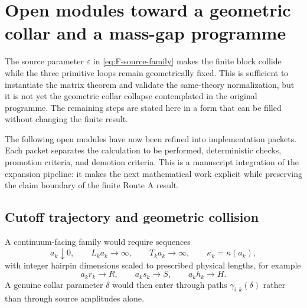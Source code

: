 \documentclass[11pt]{article}
\newcommand{\eps}{\varepsilon}
\begin{document}
\section{Open modules toward a geometric collar and a mass-gap programme}
\label{sec:open-modules}

The source parameter $\eps$ in \eqref{eq:F-source-family} makes the finite block collide while the three primitive loops remain geometrically fixed.  This is sufficient to instantiate the matrix theorem and validate the same-theory normalization, but it is not yet the geometric collar collapse contemplated in the original programme.  The remaining steps are stated here in a form that can be filled without changing the finite result.

The following open modules have now been refined into implementation packets.  Each packet separates the calculation to be performed, deterministic checks, promotion criteria, and demotion criteria.  This is a manuscript integration of the expansion pipeline: it makes the next mathematical work explicit while preserving the claim boundary of the finite Route A result.

\subsection{Cutoff trajectory and geometric collision}

A continuum-facing family would require sequences
\begin{equation}
  a_k\downarrow0,
  \qquad
  L_ka_k\longrightarrow\infty,
  \qquad
  T_ka_k\longrightarrow\infty,
  \qquad
  \kappa_k=\kappa(a_k),
  \label{eq:cutoff-trajectory}
\end{equation}
with integer hairpin dimensions scaled to prescribed physical lengths, for example
\begin{equation}
  a_kr_k\to R,
  \qquad
  a_ks_k\to S,
  \qquad
  a_kh_k\to H.
  \label{eq:physical-loop-scaling}
\end{equation}
A genuine collar parameter $\delta$ would then enter through paths $\gamma_{i,k}(\delta)$ rather than through source amplitudes alone.
\end{document}

